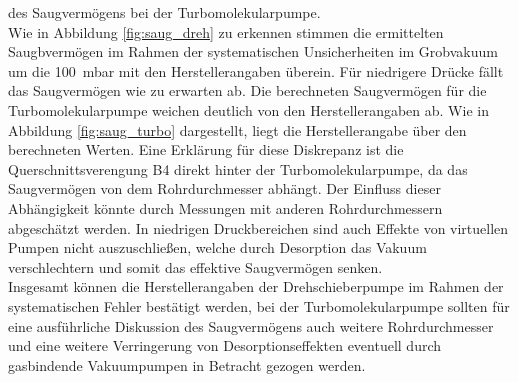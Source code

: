 des Saugvermögens bei der Turbomolekularpumpe. 
\\
Wie in Abbildung \ref{fig:saug_dreh} zu erkennen stimmen die ermittelten Saugbvermögen im Rahmen 
der systematischen Unsicherheiten im Grobvakuum um die \SI{100}{\milli\bar} mit den Herstellerangaben 
überein. Für niedrigere Drücke fällt das Saugvermögen wie zu erwarten ab. 
Die berechneten Saugvermögen für die Turbomolekularpumpe weichen deutlich von den Herstellerangaben
ab. Wie in Abbildung \ref{fig:saug_turbo} dargestellt, liegt die Herstellerangabe über den berechneten Werten.
Eine Erklärung für diese Diskrepanz ist die Querschnittsverengung B4 direkt hinter der Turbomolekularpumpe,
da das Saugvermögen von dem Rohrdurchmesser abhängt. Der Einfluss dieser Abhängigkeit könnte 
durch Messungen mit anderen Rohrdurchmessern abgeschätzt werden. In niedrigen Druckbereichen sind auch 
Effekte von virtuellen Pumpen nicht auszuschließen, welche durch Desorption das Vakuum verschlechtern 
und somit das effektive Saugvermögen senken. 
\\
Insgesamt können die Herstellerangaben der Drehschieberpumpe im Rahmen der systematischen Fehler 
bestätigt werden, bei der Turbomolekularpumpe sollten für eine ausführliche Diskussion des 
Saugvermögens auch weitere Rohrdurchmesser und eine weitere Verringerung von Desorptionseffekten 
eventuell durch gasbindende Vakuumpumpen in Betracht gezogen werden.
\newpage